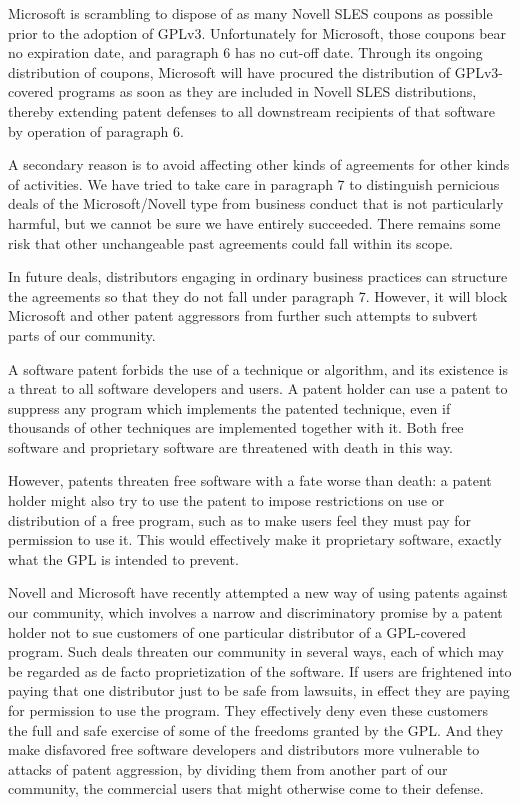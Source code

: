 Microsoft is scrambling to dispose of as many Novell SLES coupons as
possible prior to the adoption of GPLv3.  Unfortunately for Microsoft,
those coupons bear no expiration date, and paragraph 6 has no cut-off
date.  Through its ongoing distribution of coupons, Microsoft will
have procured the distribution of GPLv3-covered programs as soon as
they are included in Novell SLES distributions, thereby extending
patent defenses to all downstream recipients of that software by
operation of paragraph 6.

A secondary reason is to avoid affecting other kinds of agreements for
other kinds of activities.  We have tried to take care in paragraph 7
to distinguish pernicious deals of the Microsoft/Novell type from
business conduct that is not particularly harmful, but we cannot be
sure we have entirely succeeded.  There remains some risk that other
unchangeable past agreements could fall within its scope.

In future deals, distributors engaging in ordinary business practices
can structure the agreements so that they do not fall under paragraph
7.  However, it will block Microsoft and other patent aggressors from
further such attempts to subvert parts of our community.

A software patent forbids the use of a technique or algorithm, and its
existence is a threat to all software developers and users.  A patent
holder can use a patent to suppress any program which implements the
patented technique, even if thousands of other techniques are
implemented together with it.  Both free software and proprietary
software are threatened with death in this way.  

However, patents threaten free software with a fate worse than death: a
patent holder might also try to use the patent to impose restrictions on
use or distribution of a free program, such as to make users feel they
must pay for permission to use it.  This would effectively make it
proprietary software, exactly what the GPL is intended to prevent.

Novell and Microsoft have recently attempted a new way of using patents
against our community, which involves a narrow and discriminatory
promise by a patent holder not to sue customers of one particular
distributor of a GPL-covered program.  Such deals threaten our community
in several ways, each of which may be regarded as de facto
proprietization of the software.  If users are frightened into paying
that one distributor just to be safe from lawsuits, in effect they are
paying for permission to use the program.  They effectively deny even
these customers the full and safe exercise of some of the freedoms
granted by the GPL.  And they make disfavored free software developers
and distributors more vulnerable to attacks of patent aggression, by
dividing them from another part of our community, the commercial users
that might otherwise come to their defense.

